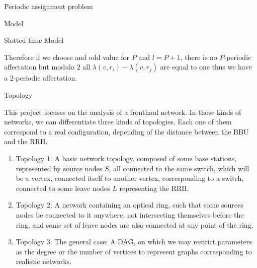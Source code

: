 \documentclass[a4paper,10pt]{report}
\begin{document}
\begin{chapter}{Periodic assignment problem}
\begin{section}{Model}
\begin{subsection}{Slotted time Model}
\begin{center}
{{Therefore if we choose and odd value for $P$ and $l=P+1$, there is no $P$-periodic affectation but modulo $2$ all $\lambda(v,r_i) - \lambda(v,r_j)$
are equal to one thus we have a $2$-periodic affectation. 
}}

\end{center}

\end{subsection}
\begin{subsection}{Topology}

This project focuses on the analysis of a fronthaul network. In those kinds of networks, we can differentiate three kinds of
topologies. Each one of them correspond to a real configuration, depending of the distance between the BBU and the RRH.
\begin{enumerate}
 \item Topology 1: A basic network topology, composed of some base stations, represented by source nodes $S$, all connected to the same switch,
which will be a vertex, connected itself to another vertex, corresponding to a switch, connected to some leave nodes $L$ representing the RRH.
\item Topology 2: A network containing an optical ring, such that some sources nodes be connected to it anywhere, not intersecting themselves before the ring,
and some set of leave nodes are also connected at any point of the ring.
\item Topology 3: The general case: A DAG, on which we may restrict parameters as the degree or the number of vertices to represent graphs corresponding to realistic networks.
\end{enumerate}
\end{subsection}
\end{section}
\end{chapter}
\end{document}
